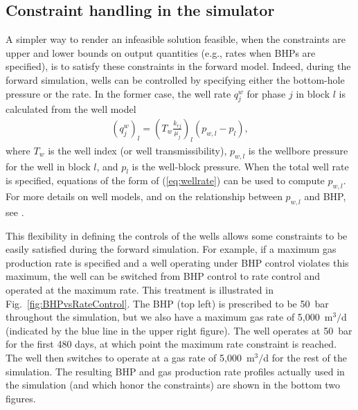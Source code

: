 \documentclass[twocolumn,numbook]{svjour3}          %
\begin{document}
\subsection{Constraint handling in the simulator}

A simpler way to render an infeasible solution feasible, when the
constraints are upper and lower bounds on output quantities 
(e.g., rates when BHPs are specified), is to satisfy these constraints 
in the forward model. Indeed, during the forward
simulation, wells can be controlled by specifying either the bottom-hole 
pressure or the rate. In the former case,
the well rate $q_j^w$ for phase $j$ in block $l$ is calculated from the well model
%
\begin{align}
\label{eq:wellrate}
  \left( q_j^w \right)_l = \left( T_w\frac{k_{rj}}{\mu_j} \right)_l (p_{w,l} - p_l),
\end{align}
%
where $T_w$ is the well index (or well transmissibility), $p_{w,l}$ is the wellbore pressure for the well in block $l$, and $p_l$ is the well-block pressure.
When the total well rate is specified, equations of the form of (\ref{eq:wellrate}) can be used to compute $p_{w,l}$. For more details on well models, and on the relationship between $p_{w,l}$ and BHP, see \cite{Cao:Thesis}.
%

This flexibility in defining the controls of the wells allows some constraints
to be easily satisfied during the forward simulation. For example, if a maximum
gas production rate is specified and a well operating under BHP control violates
this maximum, the well can be switched from BHP control to rate control and
operated at the maximum rate. This treatment is illustrated in
Fig.~\ref{fig:BHPvsRateControl}. The BHP (top left) is prescribed to be 50~bar
throughout the simulation, but we also have a maximum gas rate of 5,000~m$^3/$d
(indicated by the blue line in the upper right figure). The well operates at
50~bar for the first 480 days, at which point the maximum rate constraint is
reached. The well then switches to operate at a gas rate of 5,000~m$^3/$d for the
rest of the simulation. The resulting BHP and gas production rate profiles
actually used in the simulation (and which honor the constraints) are shown in
the bottom two figures.
\end{document}
